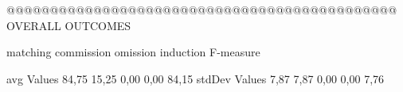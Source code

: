  @@@@@@@@@@@@@@@@@@@@@@@@@@@@@@@@@@@@@@@@@@@@@ OVERALL OUTCOMES

                matching commission   omission  induction   F-measure

avg Values       84,75       15,25       0,00       0,00       84,15        
stdDev Values    7,87        7,87       0,00       0,00        7,76        
